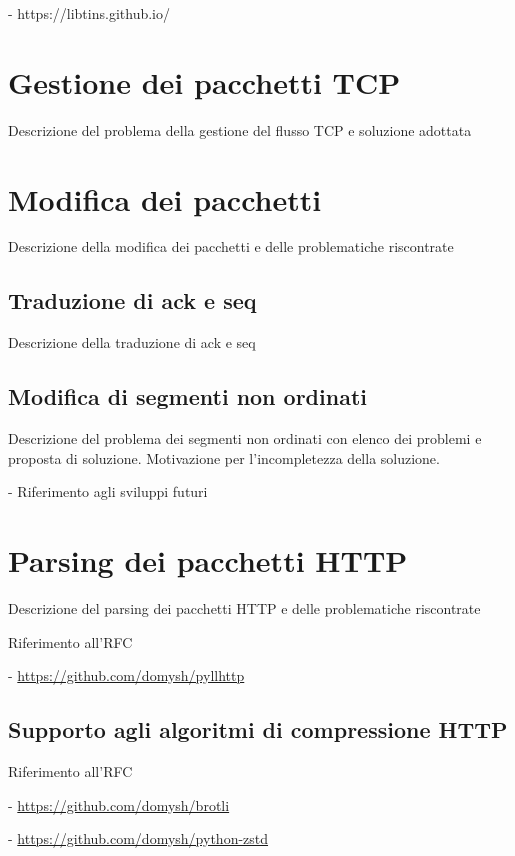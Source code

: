 - https://libtins.github.io/

\section{Gestione dei pacchetti TCP}

Descrizione del problema della gestione del flusso TCP e soluzione adottata

\section{Modifica dei pacchetti}

Descrizione della modifica dei pacchetti e delle problematiche riscontrate

\subsection{Traduzione di ack e seq}

Descrizione della traduzione di ack e seq

\subsection{Modifica di segmenti non ordinati}

Descrizione del problema dei segmenti non ordinati con elenco dei problemi e proposta di soluzione.
Motivazione per l'incompletezza della soluzione.

- Riferimento agli sviluppi futuri

\section{Parsing dei pacchetti HTTP}

Descrizione del parsing dei pacchetti HTTP e delle problematiche riscontrate

Riferimento all'RFC

- \url{https://github.com/domysh/pyllhttp}

\subsection{Supporto agli algoritmi di compressione HTTP}

Riferimento all'RFC

- \url{https://github.com/domysh/brotli}

- \url{https://github.com/domysh/python-zstd}
    

